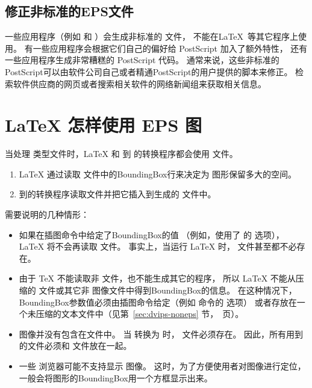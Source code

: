 \subsection{修正非标准的EPS文件}\label{ssec:fixeps}
一些应用程序（例如  和  ）会生成非标准的  文件，
不能在\LaTeX\ 等其它程序上使用。
有一些应用程序会根据它们自己的偏好给 PostScript 加入了额外特性，
还有一些应用程序生成非常糟糕的 PostScript 代码。
通常来说，这些非标准的PostScript可以由软件公司自己或者精通PostScript的用户提供的脚本来修正。
检索软件供应商的网页或者搜索相关软件的网络新闻组来获取相关信息。

\section{\LaTeX{} 怎样使用 EPS 图}\label{sec:useeps}

当处理 类型文件时，\LaTeX{} 和  到  的转换程序都会使用  文件。
\begin{enumerate}
	\item \LaTeX{} 通过读取  文件中的BoundingBox行来决定为  图形保留多大的空间。
	\item {} 到的转换程序读取文件并把它插入到生成的 文件中。
\end{enumerate}

需要说明的几种情形：
\begin{itemize}
	\item 如果在插图命令中给定了BoundingBox的值
	（例如，使用了  的  选项），
	\LaTeX{} 将不会再读取  文件。
	事实上，当运行 \LaTeX{} 时， 文件甚至都不必存在。
	\item 由于 \TeX{} 不能读取非 \ascii 文件，也不能生成其它的程序，
	所以 \LaTeX{} 不能从压缩的  文件或其它非  图像文件中得到BoundingBox的信息。
	在这种情况下，BoundingBox参数值必须由插图命令给定（例如  命令的  选项）
	或者存放在一个未压缩的文本文件中（见第~\ref{sec:dvips-noneps} 节，\pageref{sec:dvips-noneps}~页）。
	\item {} 图像并没有包含在文件中。
	当  转换为  时， 文件必须存在。
	因此，所有用到的文件必须和  文件放在一起。
	\item 一些  浏览器可能不支持显示  图像。
	这时，为了方便使用者对图像进行定位，一般会将图形的BoundingBox用一个方框显示出来。
\end{itemize}


